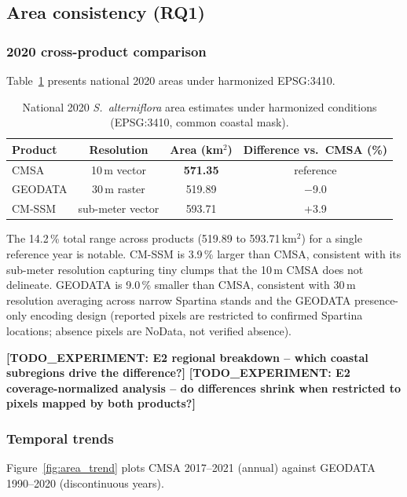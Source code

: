 \documentclass[11pt]{article}
\newcommand{\TODOEXP}[1]{\textcolor{todocolor}{\textbf{[TODO_EXPERIMENT: #1]}}}
\begin{document}
\subsection{Area consistency (RQ1)}

\subsubsection{2020 cross-product comparison}

Table~\ref{tab:area2020} presents national 2020 areas under harmonized EPSG:3410.

\begin{table}[htpb]
\centering
\caption{\label{tab:area2020}National 2020 \textit{S.~alterniflora} area estimates
  under harmonized conditions (EPSG:3410, common coastal mask).}
\begin{tabular}{l c c c}
\toprule
Product & Resolution & Area (km$^2$) & Difference vs.\ CMSA (\%) \\
\midrule
CMSA & 10\,m vector & \textbf{571.35} & reference \\
GEODATA & 30\,m raster & 519.89 & $-$9.0 \\
CM-SSM & sub-meter vector & 593.71 & +3.9 \\
\bottomrule
\end{tabular}
\end{table}

The 14.2\,\% total range across products (519.89 to 593.71\,km$^2$) for a single
reference year is notable. CM-SSM is 3.9\,\% larger than CMSA, consistent with its
sub-meter resolution capturing tiny clumps that the 10\,m CMSA does not delineate.
GEODATA is 9.0\,\% smaller than CMSA, consistent with 30\,m resolution averaging
across narrow Spartina stands and the GEODATA presence-only encoding design
(reported pixels are restricted to confirmed Spartina locations; absence pixels
are NoData, not verified absence).

\TODOEXP{E2 regional breakdown -- which coastal subregions drive the difference?}
\TODOEXP{E2 coverage-normalized analysis -- do differences shrink when restricted
to pixels mapped by both products?}

\subsubsection{Temporal trends}

Figure~\ref{fig:area_trend} plots CMSA 2017--2021 (annual) against GEODATA
1990--2020 (discontinuous years).
\end{document}
